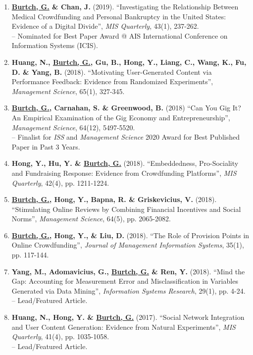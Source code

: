 \documentclass[10.5pt,letterpaper,sans]{moderncv}        %
\begin{document}
\begin{enumerate}[leftmargin=!,labelindent=5pt,itemindent=-15pt]
\item \textbf{\underline{Burtch, G.} \& Chan, J.} (2019). ``Investigating the Relationship Between Medical Crowdfunding and Personal Bankruptcy in the United States: Evidence of a Digital Divide'', \textit{MIS Quarterly}, 43(1), 237-262. \\-- Nominated for Best Paper Award @ AIS International Conference on Information Systems (ICIS).

\item \textbf{Huang, N., \underline{Burtch, G.}, Gu, B., Hong, Y., Liang, C., Wang, K., Fu, D. \& Yang, B.} (2018). ``Motivating User-Generated Content via Performance Feedback: Evidence from Randomized Experiments'', \textit{Management Science}, 65(1), 327-345.

\item \textbf{\underline{Burtch, G.}, Carnahan, S. \& Greenwood, B.} (2018) ``Can You Gig It? An Empirical Examination of the Gig Economy and Entrepreneurship'', \textit{Management Science}, 64(12), 5497-5520. \\-- Finalist for \textit{ISS} and \textit{Management Science} 2020 Award for Best Published Paper in Past 3 Years.

\item \textbf{Hong, Y., Hu, Y. \& \underline{Burtch, G.}} (2018). ``Embeddedness, Pro-Sociality and Fundraising Response: Evidence from Crowdfunding Platforms'', \textit{MIS Quarterly}, 42(4), pp. 1211-1224.

\item \textbf{\underline{Burtch, G.}, Hong, Y., Bapna, R. \& Griskevicius, V.} (2018). ``Stimulating Online Reviews by Combining Financial Incentives and Social Norms'', \textit{Management Science}, 64(5), pp. 2065-2082.

\item \textbf{\underline{Burtch, G.}, Hong, Y., \& Liu, D.} (2018). ``The Role of Provision Points in Online Crowdfunding'', \textit{Journal of Management Information Systems}, 35(1), pp. 117-144.

\item \textbf{Yang, M., Adomavicius, G., \underline{Burtch, G.} \& Ren, Y.} (2018). ``Mind the Gap: Accounting for Measurement Error and Misclassification in Variables Generated via Data Mining'', \textit{Information Systems Research}, 29(1), pp. 4-24. \\-- Lead/Featured Article.

\item \textbf{Huang, N., Hong, Y. \& \underline{Burtch, G.}} (2017). ``Social Network Integration and User Content Generation: Evidence from Natural Experiments'', \textit{MIS Quarterly}, 41(4), pp. 1035-1058. \\-- Lead/Featured Article.


\end{enumerate}
\end{document}
